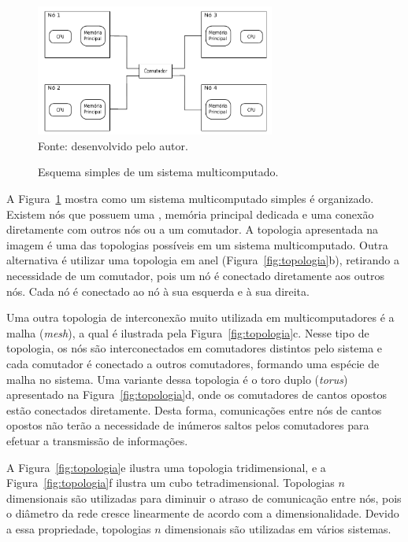 \begin{figure}[t]
	\centering
    \caption{Esquema simples de um sistema multicomputado.}
        \includegraphics[width=0.7\textwidth]{figs/multicomp.pdf} \\
        Fonte: desenvolvido pelo autor.
        \label{fig:multicomputado}
\end{figure}



A Figura~\ref{fig:multicomputado} mostra como um sistema multicomputado simples é
organizado. Existem nós que possuem uma \cpu, memória principal dedicada e uma
conexão diretamente com outros nós ou a um comutador. A topologia apresentada na
imagem é uma das topologias possíveis em um sistema multicomputado. Outra
alternativa é utilizar uma topologia em anel (Figura~\ref{fig:topologia}b), retirando a necessidade de um
comutador, pois um nó é conectado diretamente aos outros nós. Cada nó é
conectado ao nó à sua esquerda e à sua direita.

Uma outra topologia de interconexão muito utilizada em multicomputadores é a malha (\textit{mesh}),
a qual é ilustrada pela Figura~\ref{fig:topologia}c. Nesse tipo de topologia, os nós são interconectados
em comutadores distintos pelo sistema e cada comutador é conectado a outros
comutadores, formando uma espécie de malha no sistema. Uma variante dessa
topologia é o toro duplo (\textit{torus}) apresentado na Figura~\ref{fig:topologia}d, onde os
comutadores de cantos opostos estão conectados diretamente. Desta forma,
comunicações entre nós de cantos opostos não terão a necessidade de inúmeros
saltos pelos comutadores para efetuar a transmissão de informações.

A Figura~\ref{fig:topologia}e ilustra uma topologia tridimensional, e a
Figura~\ref{fig:topologia}f ilustra um cubo tetradimensional. Topologias
$n$ dimensionais são utilizadas para diminuir o atraso de comunicação entre nós,
pois o diâmetro da rede cresce linearmente de acordo com a dimensionalidade.
Devido a essa propriedade, topologias $n$ dimensionais são utilizadas em
vários sistemas.

